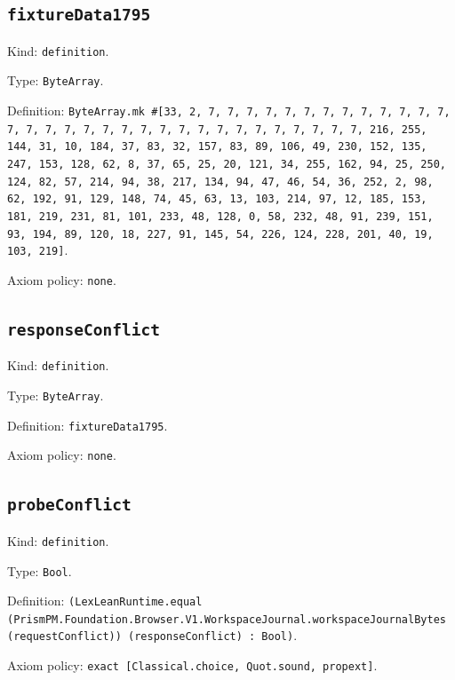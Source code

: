 \documentclass[11pt]{article}
\begin{document}
\subsection*{\texttt{fixtureData1795}}
\noindent Kind: \texttt{definition}.\par
\noindent Type: \texttt{ByteArray}.\par
\noindent Definition: \texttt{ByteArray.mk \#[33, 2, 7, 7, 7, 7, 7, 7, 7, 7, 7, 7, 7, 7, 7, 7, 7, 7, 7, 7, 7, 7, 7, 7, 7, 7, 7, 7, 7, 7, 7, 7, 7, 7, 216, 255, 144, 31, 10, 184, 37, 83, 32, 157, 83, 89, 106, 49, 230, 152, 135, 247, 153, 128, 62, 8, 37, 65, 25, 20, 121, 34, 255, 162, 94, 25, 250, 124, 82, 57, 214, 94, 38, 217, 134, 94, 47, 46, 54, 36, 252, 2, 98, 62, 192, 91, 129, 148, 74, 45, 63, 13, 103, 214, 97, 12, 185, 153, 181, 219, 231, 81, 101, 233, 48, 128, 0, 58, 232, 48, 91, 239, 151, 93, 194, 89, 120, 18, 227, 91, 145, 54, 226, 124, 228, 201, 40, 19, 103, 219]}.\par
\noindent Axiom policy: \texttt{none}.\par
\subsection*{\texttt{responseConflict}}
\noindent Kind: \texttt{definition}.\par
\noindent Type: \texttt{ByteArray}.\par
\noindent Definition: \texttt{fixtureData1795}.\par
\noindent Axiom policy: \texttt{none}.\par
\subsection*{\texttt{probeConflict}}
\noindent Kind: \texttt{definition}.\par
\noindent Type: \texttt{Bool}.\par
\noindent Definition: \texttt{(LexLeanRuntime.equal (PrismPM.Foundation.Browser.V1.WorkspaceJournal.workspaceJournalBytes (requestConflict)) (responseConflict) : Bool)}.\par
\noindent Axiom policy: \texttt{exact [Classical.choice, Quot.sound, propext]}.\par
\end{document}
